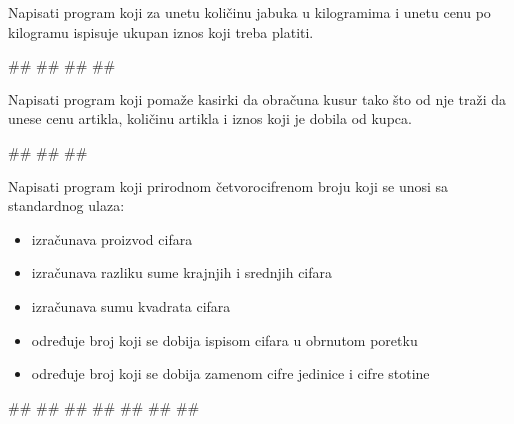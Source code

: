 \begin{Exercise}[label=p1_05] 
Napisati program koji za unetu količinu jabuka u kilogramima i unetu cenu po kilogramu ispisuje ukupan iznos koji treba platiti.\\
\begin{miditest}
\begin{upotreba}{1}
#\naslovInt#
##
##
##
\end{upotreba}
\end{miditest}
\end{Exercise}
\begin{Answer}[ref=p1_05]
\end{Answer}


\begin{Exercise}[label=p1_06] 
Napisati program koji pomaže kasirki da obračuna kusur tako što od nje traži da unese cenu artikla, količinu artikla i iznos koji je dobila od kupca. \\
\begin{miditest}
\begin{upotreba}{1}
#\naslovInt#
##
##
\end{upotreba}
\end{miditest}
\end{Exercise}
\begin{Answer}[ref=p1_06]
\end{Answer}


\begin{Exercise}[label=p1_07] 
Napisati program koji prirodnom četvorocifrenom broju koji se unosi sa standardnog ulaza:
\begin{itemize}
\item izračunava proizvod cifara
\item izračunava razliku sume krajnjih i srednjih cifara 
\item izračunava sumu kvadrata cifara
\item određuje broj koji se dobija ispisom cifara u obrnutom poretku
\item određuje broj koji se dobija zamenom cifre jedinice i cifre stotine
\end{itemize}

\begin{maxitest}
\begin{upotreba}{1}
#\naslovInt#
##
##
##
##
##
##
\end{upotreba}
\end{maxitest}
\end{Exercise}
\begin{Answer}[ref=p1_07]
\end{Answer}


